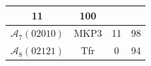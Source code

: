 \begin{table}[!t]
\begin{tabular}{|c|c||c|c|}
11

&

100

\\ \hline

$\mathcal{A}_{7}(02010)$

&

MKP3


&

11

&

98

\\ \hline

$\mathcal{A}_{8}(02121)$

&

Tfr


&

0

&

94

\\ \hline

 
\end{tabular}
\end{table}








%
%



